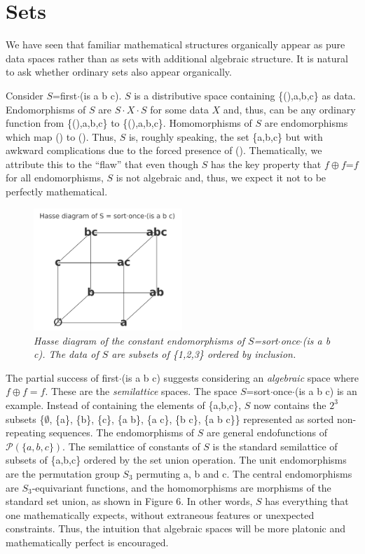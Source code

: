 \documentclass[11pt]{article}
\begin{document}
\section{Sets}

    We have seen that familiar mathematical structures organically appear as pure data spaces rather than as sets with additional algebraic structure.  
It is natural to ask whether ordinary sets also appear organically.  

     Consider $S$=first$\cdot$(is a b c).  $S$ is a distributive space containing \{(),a,b,c\} as data.  Endomorphisms of $S$ are  
$S\cdot X\cdot S$ for some data $X$ and, thus, can be any ordinary function from \{(),a,b,c\} to \{(),a,b,c\}.  Homomorphisms of $S$ 
are endomorphisms which map () to ().  Thus, $S$ is, roughly speaking, the set \{a,b,c\} but with awkward complications due 
to the forced presence of ().  Thematically, we attribute this to the ``flaw'' that even though $S$ has the key property 
that $f\oplus f$=$f$ for all endomorphisms, $S$ is not algebraic and, thus, we expect it not to be perfectly mathematical.  

\begin{figure}[h]
\centering
\includegraphics[width=0.5\textwidth]{hasse.png}
\caption{{\it Hasse diagram of the constant endomorphisms of $S$=sort$\cdot$once$\cdot$(is a b c).  The data of $S$ are subsets 
of \{1,2,3\} ordered by inclusion.}}
\end{figure}

     The partial success of first$\cdot$(is a b c) suggests considering an {\it algebraic} space where $f\oplus f=f$.  
These are the {\it semilattice} spaces.  The space $S$=sort$\cdot$once$\cdot$(is a b c) is an example.  
Instead of containing the elements of \{a,b,c\}, $S$ now contains the $2^3$ subsets \{$\emptyset$, \{a\}, \{b\}, \{c\}, \{a b\}, \{a c\}, \{b c\}, \{a b c\}\} 
represented as sorted non-repeating sequences.  The endomorphisms of $S$ are general endofunctions of ${\mathcal P}(\{a,b,c\})$.  The semilattice of 
constants of $S$ is the standard semilattice of subsets of \{a,b,c\} ordered by the set union operation.  
The unit endomorphisms are the permutation group $S_3$ permuting a, b and c.  The central endomorphisms are $S_3$-equivariant functions, and the homomorphisms 
are morphisms of the standard set union, as shown in Figure 6.  In other words, $S$ has everything that one mathematically expects, without extraneous features or 
unexpected constraints.  Thus, the intuition that algebraic spaces will be more platonic and mathematically perfect is encouraged.  
\end{document}
